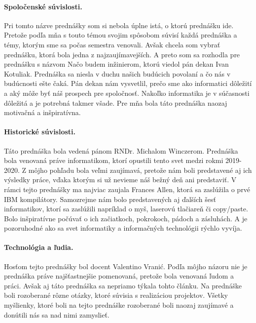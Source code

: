 \documentclass[10pt,twoside,slovak,a4paper]{article}
\begin{document}
\paragraph{Spoločenské súvislosti.}Pri tomto názve prednášky som si nebola úplne istá, o ktorú prednášku ide. Pretože podľa mňa s touto témou svojim spôsobom súvisí každá prednáška a témy, ktorým sme sa počas semestra venovali. Avšak chcela som vybrať prednášku, ktorá bola jedna z najzaujímavejších. A preto som sa rozhodla pre prednášku s názvom Načo budem inžinierom, ktorú viedol pán dekan Ivan Kotuliak. Prednáška sa niesla v duchu našich budúcich povolaní a čo nás v budúcnosti ešte čaká. Pán dekan nám vysvetlil, prečo sme ako informatici dôležití a aký môže byť náš prospech pre spoločnosť. Nakoľko informatika je v súčasnosti dôležitá a je potrebná takmer všade. Pre mňa bola táto prednáška naozaj motivačná a inšpiratívna. 


\paragraph{Historické súvislosti.}Táto prednáška bola vedená pánom RNDr. Michalom Winczerom. Prednáška bola venovaná práve informatikom, ktorí opustili tento svet medzi rokmi 2019-2020. Z môjho pohľadu bola veľmi zaujímavá, pretože nám boli predstavené aj ich výsledky práce, vďaka ktorým si už nevieme náš bežný deň ani predstaviť. V rámci tejto prednášky ma najviac zaujala Frances Allen, ktorá sa zaslúžila o prvé IBM kompilátory. Samozrejme nám bolo predstavených aj ďalších šesť informatikov, ktorí sa zaslúžili napríklad o myš, laserovú tlačiareň či copy/paste. Bolo inšpiratívne počúvať o
ich začiatkoch, pokrokoch, pádoch a zásluhách. A je pozoruhodné ako sa svet informatiky a informačných technológii rýchlo vyvíja. 



\paragraph{Technológia a ľudia.}Hosťom tejto prednášky bol docent Valentino Vranić. Podľa môjho názoru nie je prednáška práve najšťastnejšie pomenovaná, pretože bola venovaná ľudom a práci. Avšak aj táto prednáška sa nepriamo týkala tohto článku. Na prednáške boli rozoberané rôzne otázky, ktoré súvisia s realizáciou projektov. Všetky myšlienky, ktoré boli na tejto prednáške rozoberané boli naozaj zaujímavé a donútili nás sa nad nimi zamyslieť.
\end{document}
